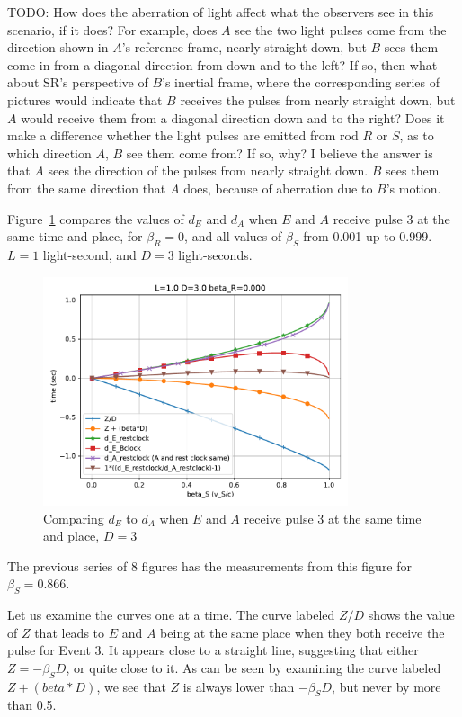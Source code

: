 \documentclass[a4paper]{article}
\theoremstyle{plain}
\theoremstyle{definition}
\begin{document}
TODO: How does the aberration of light affect what the observers see
in this scenario, if it does?  For example, does $A$ see the two light
pulses come from the direction shown in $A$'s reference frame, nearly
straight down, but $B$ sees them come in from a diagonal direction
from down and to the left?  If so, then what about SR's perspective of
$B$'s inertial frame, where the corresponding series of pictures would
indicate that $B$ receives the pulses from nearly straight down, but
$A$ would receive them from a diagonal direction down and to the
right?  Does it make a difference whether the light pulses are emitted
from rod $R$ or $S$, as to which direction $A$, $B$ see them come
from?  If so, why?  I believe the answer is that $A$ sees the direction of
the pulses from nearly straight down.  $B$ sees them from the same direction
that $A$ does, because of aberration due to $B$'s motion.

Figure~\ref{fig:compare-d_E-to-d_A-D-3} compares the values of $d_E$ and
$d_A$ when $E$ and $A$ receive pulse 3 at the same time and place, for
$\beta_R = 0$, and all values of $\beta_S$ from 0.001 up to 0.999.
$L=1$ light-second, and $D=3$ light-seconds.
\begin{figure}[h!]
	\centering
	\includegraphics[width=0.8\textwidth]{scen2b-where-E-starts-to-receive-pulse-3-at-A-location-D-3.0-beta_R-0.000.pdf}
	\caption{Comparing $d_E$ to $d_A$ when $E$ and $A$ receive pulse 3 at the same time and place, $D=3$}
	\label{fig:compare-d_E-to-d_A-D-3}
\end{figure}
The previous series of 8 figures has the measurements from this figure
for $\beta_S=0.866$.

Let us examine the curves one at a time.  The curve labeled $Z/D$
shows the value of $Z$ that leads to $E$ and $A$ being at the same
place when they both receive the pulse for Event 3.  It appears close
to a straight line, suggesting that either $Z = -\beta_S D$, or quite
close to it.  As can be seen by examining the curve labeled
$Z+(beta*D)$, we see that $Z$ is always lower than $-\beta_SD$, but
never by more than 0.5.
\end{document}
